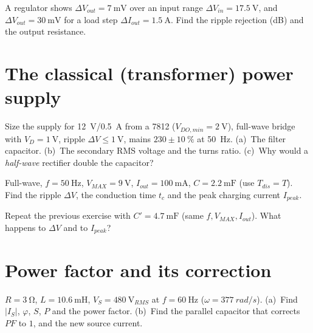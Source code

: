 \documentclass[11pt,a4paper,oneside]{book}
\begin{document}
\begin{exercise}
A regulator shows $\Delta V_{out}=\qty{7}{\milli\volt}$ over an input range
$\Delta V_{in}=\qty{17.5}{\volt}$, and $\Delta V_{out}=\qty{30}{\milli\volt}$ for
a load step $\Delta I_{out}=\qty{1.5}{\ampere}$. Find the ripple rejection (dB)
and the output resistance.
\end{exercise}

\chapter{The classical (transformer) power supply}

\begin{exercise}
Size the supply for \qty{12}{\volt}/\qty{0.5}{\ampere} from a 7812
($V_{DO,min}=\qty{2}{\volt}$), full-wave bridge with $V_D=\qty{1}{\volt}$, ripple
$\Delta V\le\qty{1}{\volt}$, mains $230\pm\qty{10}{\percent}$ at \qty{50}{\hertz}.
(a)~The filter capacitor.
(b)~The secondary RMS voltage and the turns ratio.
(c)~Why would a \emph{half-wave} rectifier double the capacitor?
\end{exercise}

\begin{exercise}
Full-wave, $f=\qty{50}{\hertz}$, $V_{MAX}=\qty{9}{\volt}$,
$I_{out}=\qty{100}{\milli\ampere}$, $C=\qty{2.2}{\milli\farad}$ (use
$T_{dis}=T$). Find the ripple $\Delta V$, the conduction time $t_c$ and the peak
charging current $I_{peak}$.
\end{exercise}

\begin{exercise}
Repeat the previous exercise with $C'=\qty{4.7}{\milli\farad}$ (same
$f,V_{MAX},I_{out}$). What happens to $\Delta V$ and to $I_{peak}$?
\end{exercise}

\chapter{Power factor and its correction}

\begin{exercise}
$R=\qty{3}{\ohm}$, $L=\qty{10.6}{\milli\henry}$, $V_S=\qty{480}{\volt_{RMS}}$ at
$f=\qty{60}{\hertz}$ ($\omega=\qty{377}{rad/s}$).
(a)~Find $|I_S|$, $\varphi$, $S$, $P$ and the power factor.
(b)~Find the parallel capacitor that corrects $PF$ to $1$, and the new source
current.
\end{exercise}
\end{document}
